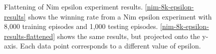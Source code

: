\documentclass[11pt,a4paper,twoside,openright]{report}
\begin{document}
\begin{figure}[htbp]
    \centering
    \caption{Flattening of Nim epsilon experiment results. \ref{nim-8k-epsilon-results} shows the winning rate from a Nim epsilon experiment with 8,000 training episodes and 1,000 testing episodes. \ref{nim-8k-epsilon-results-flattened} shows the same results, but projected onto the y-axis. Each data point corresponds to a different value of epsilon.}
    \label{nim-epsilon-flattening}
\end{figure}
\end{document}
